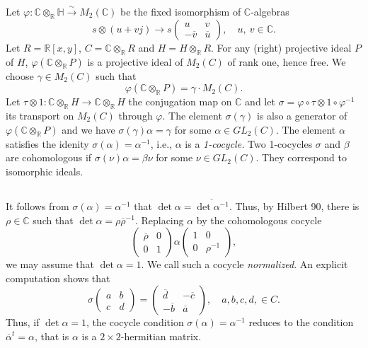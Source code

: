 Let
$\varphi:\mathbb{C}\otimes_{\mathbb{R}}\mathbb{H}\xrightarrow{\sim}M_{2}(\mathbb{C})$
be the fixed isomorphism of $\mathbb{C}$-algebras 
$$
s\otimes (u+vj)\to s
\begin{pmatrix}
u & v\\
-\overline{v} & \overline{u}
\end{pmatrix},\quad u, \ v\in \mathbb{C}.
$$\pageoriginale
Let $R=\mathbb{R}[x,y]$, $C=\mathbb{C}\otimes_{\mathbb{R}}R$ and
$H=H\otimes_{\mathbb{R}}R$. For any (right) projective ideal $P$ of
$H$, $\varphi(\mathbb{C}\otimes_{\mathbb{R}}P)$ is a projective ideal
of $M_{2}(C)$ of rank one, hence free. We choose $\gamma\in M_{2}(C)$
such that
\setcounter{equation}{1}
\begin{equation}
\varphi(\mathbb{C}\otimes_{\mathbb{R}}P)=\gamma\cdot M_{2}(C).\label{chap9-eq5.2}
\end{equation}
Let $\tau\otimes
1:\mathbb{C}\otimes_{\mathbb{R}}H\to \mathbb{C}\otimes_{\mathbb{R}}H$
the conjugation map on $\mathbb{C}$ and let
$\sigma=\varphi\circ \tau\otimes 1\circ \varphi^{-1}$ its transport on
$M_{2}(C)$ through $\varphi$. The element $\sigma(\gamma)$ is also a
generator of $\varphi(\mathbb{C}\otimes_{\mathbb{R}}P)$ and we have
$\sigma(\gamma)\alpha=\gamma$ for some $\alpha\in GL_{2}(C)$. The
element $\alpha$ satisfies the idenity $\sigma(\alpha)=\alpha^{-1}$,
i.e., $\alpha$ is a {\em 1-cocycle.} Two 1-cocycles $\sigma$ and
$\beta$ are cohomologous if $\sigma(\nu)\alpha=\beta\nu$ for some
$\nu\in GL_{2}(C)$. They correspond to isomorphic ideals.

\subsection{}\label{chap9-sec5.2}
It follows from $\sigma(\alpha)=\alpha^{-1}$ that
$\det\alpha=\overline{\det\alpha^{-1}}$. Thus, by Hilbert 90, there is
$\rho\in \mathbb{C}$ such that
$\det \alpha=\rho\overline{\rho}^{-1}$. Replacing $\alpha$ by the
cohomologous cocycle 
$$
\begin{pmatrix}
\overline{\rho} & 0\\
0 & 1
\end{pmatrix}
\alpha
\begin{pmatrix}
1 & 0\\
0 & \rho^{-1}
\end{pmatrix},
$$
we may assume that $\det\alpha=1$. We call such a cocycle {\em
normalized}. An explicit computation shows that 
$$
\sigma
\begin{pmatrix}
a & b\\
c & d
\end{pmatrix}
=
\begin{pmatrix}
\overline{d} & -\overline{c}\\
-\overline{b} & \overline{a}
\end{pmatrix},\quad a,b,c,d,\in C.
$$
Thus, if $\det \alpha=1$, the cocycle condition
$\sigma(\alpha)=\alpha^{-1}$ reduces to the condition
$\overline{\alpha}^{t}=\alpha$, that is $\alpha$ is a $2\times
2$-hermitian matrix. 

